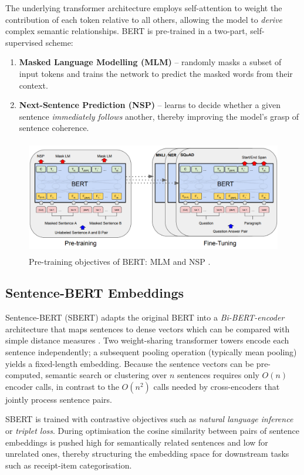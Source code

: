 \documentclass{SGGW-thesis-EN}
\begin{document}
The underlying transformer architecture employs self-attention to weight the contribution of each token relative to all others, allowing 
the model to \emph{derive} complex semantic relationships.
BERT is pre-trained in a two-part, self-supervised scheme:
\begin{enumerate}
  \item \textbf{Masked Language Modelling (MLM)} – randomly masks a subset of input tokens and trains the network to predict the 
        masked words from their context.
  \item \textbf{Next-Sentence Prediction (NSP)} – learns to decide whether a given sentence \emph{immediately follows} another, 
        thereby improving the model’s grasp of sentence coherence.
\end{enumerate}

\begin{figure}[h!]
  \centering
  \includegraphics[height=5cm]{images/bert_procedures.png}
  \caption{Pre-training objectives of BERT: MLM and NSP \cite{devlin2019bertpretrainingdeepbidirectional}.}
  \label{fig:bert_procedures}
\end{figure}

\subsection{Sentence-BERT Embeddings}
Sentence-BERT (SBERT) adapts the original BERT into a \emph{Bi-BERT-encoder} architecture that
maps sentences to dense vectors which can be compared with simple distance measures
\cite{reimers2019sbert}.
Two weight-sharing transformer towers encode each sentence independently; a subsequent pooling
operation (typically mean pooling) yields a fixed-length embedding.
Because the sentence vectors can be pre-computed, semantic search or clustering over \(n\)
sentences requires only \(O(n)\) encoder calls, in contrast to the \(O(n^{2})\) calls needed by
cross-encoders that jointly process sentence pairs.

SBERT is trained with contrastive objectives such as \emph{natural language inference} or
\emph{triplet loss}.
During optimisation the cosine similarity between pairs of sentence embeddings is pushed high
for semantically related sentences and low for unrelated ones, thereby structuring the
embedding space for downstream tasks such as receipt-item categorisation.
\end{document}
